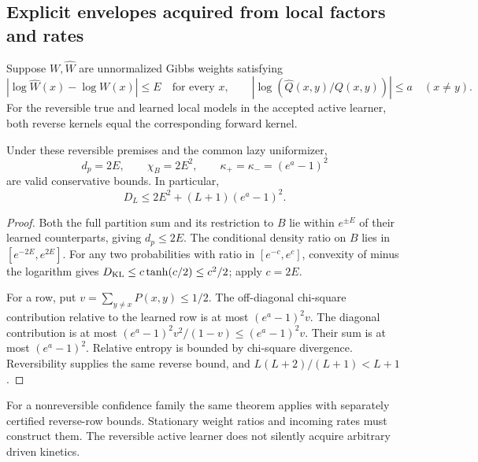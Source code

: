 \subsection{Explicit envelopes acquired from local factors and rates}
Suppose $W,\widehat W$ are unnormalized Gibbs weights satisfying
\begin{equation}
|\log\widehat W(x)-\log W(x)|\le E
\quad\text{for every }x,
\qquad
|\log(\widehat Q(x,y)/Q(x,y))|\le a
\quad(x\ne y).
\label{eq:local-envelope}
\end{equation}
For the reversible true and learned local models in the accepted active
learner, both reverse kernels equal the corresponding forward kernel.

\begin{lemma}\label{lem:localKL}
Under these reversible premises and the common lazy uniformizer,
\begin{equation}
d_p=2E,\qquad
\chi_B=2E^2,\qquad
\kappa_+=\kappa_-=(e^a-1)^2
\label{eq:envelopes}
\end{equation}
are valid conservative bounds. In particular,
\begin{equation}
D_L\le 2E^2+(L+1)(e^a-1)^2.
\label{eq:reversibleDL}
\end{equation}
\end{lemma}
\begin{proof}
Both the full partition sum and its restriction to $B$ lie within
$e^{\pm E}$ of their learned counterparts, giving $d_p\le2E$.
The conditional density ratio on $B$ lies in $[e^{-2E},e^{2E}]$.
For any two probabilities with ratio in $[e^{-c},e^c]$,
convexity of minus the logarithm gives
$D_{\rm KL}\le c\tanh(c/2)\le c^2/2$; apply $c=2E$.

For a row, put $v=\sum_{y\ne x}\widehat P(x,y)\le1/2$.
The off-diagonal chi-square contribution relative to the learned row is
at most $(e^a-1)^2v$. The diagonal contribution is at most
$(e^a-1)^2v^2/(1-v)\le(e^a-1)^2v$.
Their sum is at most $(e^a-1)^2$. Relative entropy is bounded by
chi-square divergence. Reversibility supplies the same reverse bound,
and $L(L+2)/(L+1)<L+1$.
\end{proof}

For a nonreversible confidence family the same theorem applies with
separately certified reverse-row bounds. Stationary weight ratios and
incoming rates must construct them. The reversible active learner does
not silently acquire arbitrary driven kinetics.

